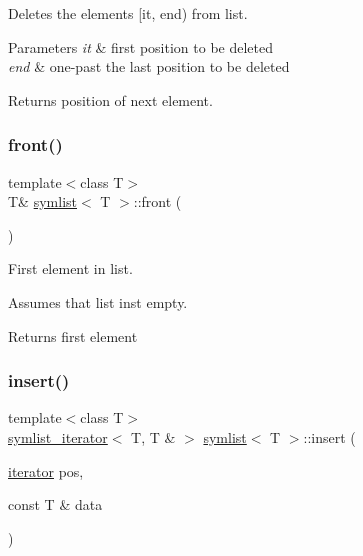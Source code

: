 Deletes the elements {\ttfamily \mbox{[}it, end)} from list. 


\begin{DoxyParams}{Parameters}
{\em it} & first position to be deleted \\
\hline
{\em end} & one-\/past the last position to be deleted\\
\hline
\end{DoxyParams}
\begin{DoxyReturn}{Returns}
position of next element. 
\end{DoxyReturn}
\mbox{\label{classsymlist_afd4b55616fc20033d4a47684551866e8}} 
\subsubsection{\texorpdfstring{front()}{front()}}
{\footnotesize\ttfamily template$<$class T$>$ \\
T\& \mbox{\hyperlink{classsymlist}{symlist}}$<$ T $>$\+::front (\begin{DoxyParamCaption}{ }\end{DoxyParamCaption})\hspace{0.3cm}{\ttfamily [inline]}}



First element in list. 

Assumes that list ins\textquotesingle{}t empty.

\begin{DoxyReturn}{Returns}
first element 
\end{DoxyReturn}
\mbox{\label{classsymlist_a8b3327b8a33b180bf1eb802856f755c3}} 
\subsubsection{\texorpdfstring{insert()}{insert()}}
{\footnotesize\ttfamily template$<$class T$>$ \\
\mbox{\hyperlink{structsymlist__iterator}{symlist\+\_\+iterator}}$<$ T, T \& $>$ \mbox{\hyperlink{classsymlist}{symlist}}$<$ T $>$\+::insert (\begin{DoxyParamCaption}\item[{\mbox{\hyperlink{structsymlist__iterator}{iterator}}}]{pos,  }\item[{const T \&}]{data }\end{DoxyParamCaption})}



